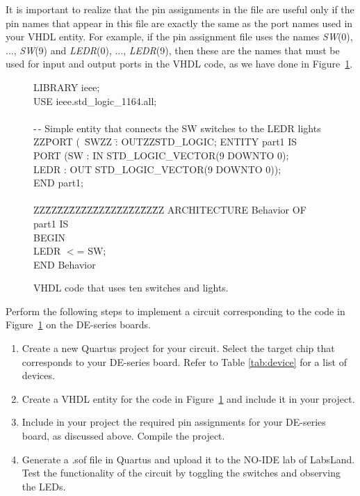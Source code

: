 \documentclass[epsfig,10pt,fullpage]{article}
\begin{document}
It is important to realize that the pin assignments in the
file are useful only if the pin names that appear in this file
are exactly the same as the port names used in your VHDL entity.
For example, if the pin assignment file uses the names {\it SW}(0), $\ldots$, {\it SW}(9) 
and {\it LEDR}(0), $\ldots$, {\it LEDR}(9), then these are the names that must be used
for input and output ports in the VHDL code, as we have done in Figure~\ref{fig:1}.

\begin{figure}[H]
\begin{center}
\begin{minipage}[t]{12.5 cm}
\begin{tabbing}
LIBRARY ieee;\\
USE ieee.std\_logic\_1164.all;\\
~\\
-\,- Simple entity that connects the SW switches to the LEDR lights\\
ZZ\=PORT (~\=SWZZ \=: OUTZZ\=STD\_LOGIC;\kill
ENTITY part1 IS \\
\>PORT (\>SW \>: IN \>STD\_LOGIC\_VECTOR(9 DOWNTO 0);\\
\>\>LEDR \>: OUT \>STD\_LOGIC\_VECTOR(9 DOWNTO 0));\\
END part1;\\
~\\
ZZ\=ZZ\=ZZ\=ZZ\=ZZ\=ZZ\=ZZ\=ZZ\=ZZ\=ZZ\=ZZ\kill
ARCHITECTURE Behavior OF part1 IS\\
BEGIN\\
\>LEDR $<$= SW;\\
END Behavior\\
\end{tabbing}
\end{minipage}
	\caption{VHDL code that uses ten switches and lights.}
	\label {fig:1}
\end{center}
\end{figure}

\newpage
Perform the following steps to implement a circuit corresponding to the code
in  Figure~\ref{fig:1} on the DE-series boards.
\begin{enumerate}
\item Create a new Quartus project for your circuit. Select the target chip that corresponds to your DE-series board.
Refer to Table \ref{tab:device} for a list of devices.
\item Create a VHDL entity for the code in  Figure~\ref{fig:1} and include it in your project.
\item Include in your project the required pin assignments for your DE-series board, as discussed
above. Compile the project.
\item Generate a .sof file in Quartus and upload it to the NO-IDE lab of LabsLand. Test the functionality of the circuit by toggling the switches and observing the LEDs.
\end{enumerate}
\end{document}
